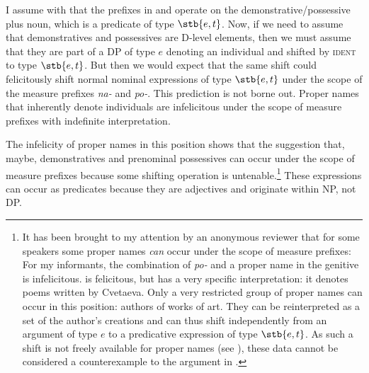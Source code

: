 \documentclass[output=paper,
colorlinks,
citecolor=brown,
newtxmath
]{langscibook}
\begin{document}
I assume with \citet{Filip2005} that the prefixes in  and  operate on the demonstrative/possessive plus noun, which is a predicate of type $\stb{e,t}$. Now, if we need to assume that demonstratives and possessives are D-level elements, then we must assume that they are part of a DP of type $e$ denoting an individual and shifted by \textsc{ident} to type $\stb{e,t}$. But then we would expect that the same shift could felicitously shift normal nominal expressions of type $\stb{e,t}$ under the scope of the measure prefixes \textit{na-} and \textit{po-}. This prediction is not borne out. Proper names that inherently denote individuals are infelicitous under the scope of measure prefixes with indefinite interpretation.


\ea\label{nasmotret} 
\z\z 

\noindent The infelicity of proper names in this position shows that the suggestion that, maybe, demonstratives and prenominal possessives can occur under the scope of measure prefixes because some shifting operation is untenable.\footnote{It has been brought to my attention by an anonymous reviewer that for some speakers some proper names \emph{can} occur under the scope of measure prefixes:
\ea
\z\z 
\noindent For my informants, the combination of \textit{po-} and a proper name in the genitive is infelicitous.  is felicitous, but has a very specific interpretation: it denotes poems written by Cvetaeva. Only a very restricted group of proper names can occur in this position: authors of works of art. They can be reinterpreted as a set of the author's creations and can thus shift independently from an argument of type $e$ to a predicative expression of type $\stb{e,t}$. As such a shift is not freely available for proper names (see ), these data cannot be considered a counterexample to the argument in .
}
These expressions can occur as predicates because they are adjectives and originate within NP, not DP.
\end{document}
